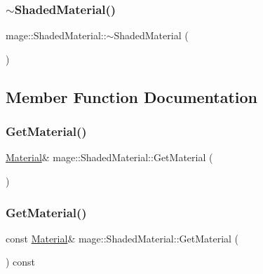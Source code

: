 \hypertarget{structmage_1_1_shaded_material_ac7be54322faed90a07b26225e270e571}{}\label{structmage_1_1_shaded_material_ac7be54322faed90a07b26225e270e571} 
\subsubsection{\texorpdfstring{$\sim$\+Shaded\+Material()}{~ShadedMaterial()}}
{\footnotesize\ttfamily mage\+::\+Shaded\+Material\+::$\sim$\+Shaded\+Material (\begin{DoxyParamCaption}{ }\end{DoxyParamCaption})\hspace{0.3cm}{\ttfamily [default]}}



\subsection{Member Function Documentation}
\hypertarget{structmage_1_1_shaded_material_a785d01e0156c6aba84d479917b62ab03}{}\label{structmage_1_1_shaded_material_a785d01e0156c6aba84d479917b62ab03} 
\subsubsection{\texorpdfstring{Get\+Material()}{GetMaterial()}\hspace{0.1cm}{\footnotesize\ttfamily [1/2]}}
{\footnotesize\ttfamily \hyperlink{structmage_1_1_material}{Material}\& mage\+::\+Shaded\+Material\+::\+Get\+Material (\begin{DoxyParamCaption}{ }\end{DoxyParamCaption})}

\hypertarget{structmage_1_1_shaded_material_a936a1cb2c79b28818814ac504d059ea3}{}\label{structmage_1_1_shaded_material_a936a1cb2c79b28818814ac504d059ea3} 
\subsubsection{\texorpdfstring{Get\+Material()}{GetMaterial()}\hspace{0.1cm}{\footnotesize\ttfamily [2/2]}}
{\footnotesize\ttfamily const \hyperlink{structmage_1_1_material}{Material}\& mage\+::\+Shaded\+Material\+::\+Get\+Material (\begin{DoxyParamCaption}{ }\end{DoxyParamCaption}) const}

